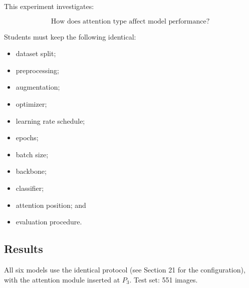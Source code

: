 \documentclass[10pt]{article}
\begin{document}
This experiment investigates:

\[
\boxed{
\text{How does attention type affect model performance?}
}
\]

Students must keep the following identical:

\begin{itemize}

\item dataset split;

\item preprocessing;

\item augmentation;

\item optimizer;

\item learning rate schedule;

\item epochs;

\item batch size;

\item backbone;

\item classifier;

\item attention position; and

\item evaluation procedure.

\end{itemize}


\subsection*{Results}

All six models use the identical protocol (see Section 21 for the configuration), with the
attention module inserted at $P_3$. Test set: 551 images.
\end{document}
